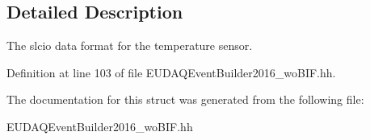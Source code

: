 \subsection{Detailed Description}
The slcio data format for the temperature sensor. 

Definition at line 103 of file E\-U\-D\-A\-Q\-Event\-Builder2016\-\_\-wo\-B\-I\-F.\-hh.



The documentation for this struct was generated from the following file\-:\begin{DoxyCompactItemize}
\item 
E\-U\-D\-A\-Q\-Event\-Builder2016\-\_\-wo\-B\-I\-F.\-hh\end{DoxyCompactItemize}
